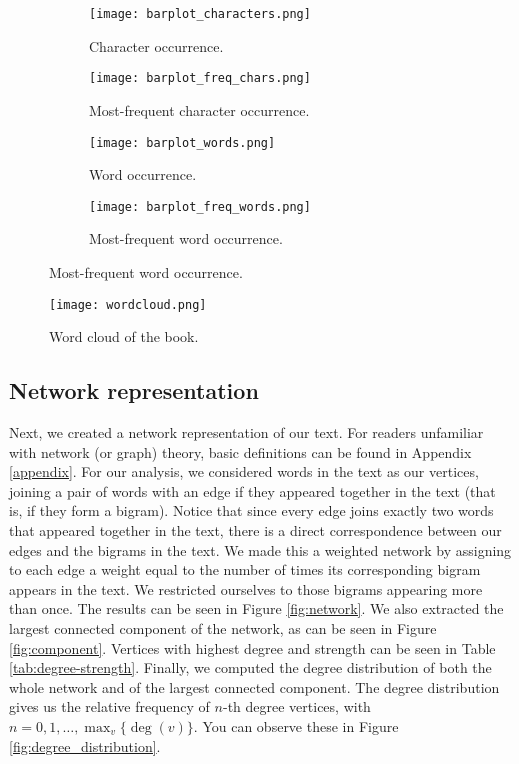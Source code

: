 \documentclass[letterpaper, 10 pt, conference]{article}
\begin{document}
 \begin{figure}
 	\centering
 	\caption{Barplots of words and characters occurences.} 
 	\begin{subfigure}[b]{0.45\linewidth}
 		\caption{Character occurrence.}
 		\texttt{[image: barplot\_characters.png]}
 	\end{subfigure}
 	\begin{subfigure}[b]{0.45\linewidth}
 		\caption{Most-frequent character occurrence.}
 		\texttt{[image: barplot\_freq\_chars.png]}
 	\end{subfigure}
 	\begin{subfigure}[b]{0.45\linewidth}
 		\caption{Word occurrence.}
 		\texttt{[image: barplot\_words.png]}
 	\end{subfigure}
	\begin{subfigure}[b]{0.45\linewidth}
 		\caption{Most-frequent word occurrence.}
 		\texttt{[image: barplot\_freq\_words.png]}
 	\end{subfigure}
 	\label{fig:barplots_chars_words}
 \end{figure}

\begin{figure}
	\centering
	\caption{Word cloud of the book.}
	\texttt{[image: wordcloud.png]}
	\label{fig:wordcloud}
\end{figure}

\subsection{Network representation}
Next, we created a network representation of our text. For readers unfamiliar with network (or graph) theory, basic definitions can be found in Appendix \ref{appendix}. For our analysis, we considered words in the text as our vertices, joining a pair of words with an edge if they appeared together in the text (that is, if they form a bigram). Notice that since every edge joins exactly two words that appeared together in the text, there is a direct correspondence between our edges and the bigrams in the text. We made this a weighted network by assigning to each edge a weight equal to the number of times its corresponding bigram appears in the text. We restricted ourselves to those bigrams appearing more than once. The results can be seen in Figure \ref{fig:network}.  We also extracted the largest connected component of the network, as can be seen in Figure \ref{fig:component}. Vertices with highest degree and strength can be seen in Table \ref{tab:degree-strength}. Finally, we computed the degree distribution of both the whole network and of the largest connected component. The degree distribution gives us the relative frequency of $n$-th degree vertices, with $n = 0, 1, \dots, \max_{v} \lbrace \deg (v) \rbrace$. You can observe these in Figure \ref{fig:degree_distribution}. 
\end{document}
